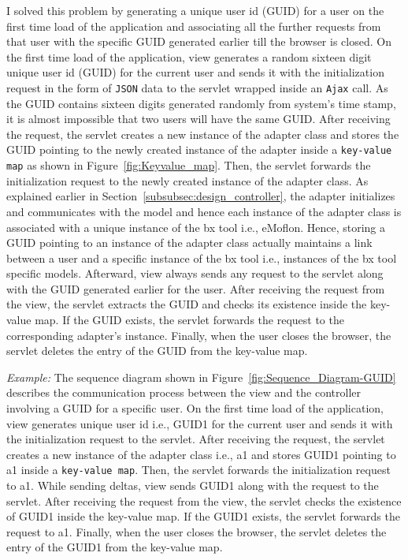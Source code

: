 I solved this problem by generating a unique user id (GUID) for a user on the first time load of the application and associating all the further requests from that user with the specific GUID generated earlier till the browser is closed. On the first time load of the application, view generates a random sixteen digit unique user id (GUID) for the current user and sends it with the initialization request in the form of \texttt{JSON} data to the servlet wrapped inside an \texttt{Ajax} call. As the GUID contains sixteen digits generated randomly from system's time stamp, it is almost impossible that two users will have the same GUID. After receiving the request, the servlet creates a new instance of the adapter class and stores the GUID pointing to the newly created instance of the adapter inside a \texttt{key-value map} as shown in Figure~\ref{fig:Keyvalue_map}. Then, the servlet forwards the initialization request to the newly created instance of the adapter class. As explained earlier in Section~\ref{subsubsec:design_controller}, the adapter initializes and communicates with the model and hence each instance of the adapter class is associated with a unique instance of the bx tool i.e., eMoflon. Hence, storing a GUID pointing to an instance of the adapter class actually maintains a link between a user and a specific instance of the bx tool i.e., instances of the bx tool specific models. Afterward, view always sends any request to the servlet along with the GUID generated earlier for the user. After receiving the request from the view, the servlet extracts the GUID and checks its existence inside the  key-value map. If the GUID exists, the servlet forwards the request to the corresponding adapter's instance. Finally, when the user closes the browser, the servlet deletes the entry of the GUID from the key-value map.

\textit{Example:} The sequence diagram shown in Figure~\ref{fig:Sequence_Diagram-GUID} describes the communication process between the view and the controller involving a GUID for a specific user. On the first time load of the application, view generates unique user id i.e., GUID1 for the current user and sends it with the initialization request to the servlet. After receiving the request, the servlet creates a new instance of the adapter class i.e., a1 and stores GUID1 pointing to a1 inside a \texttt{key-value map}. Then, the servlet forwards the initialization request to a1. While sending deltas, view sends GUID1 along with the request to the servlet. After receiving the request from the view, the servlet checks the existence of GUID1 inside the key-value map. If the GUID1 exists, the servlet forwards the request to a1. Finally, when the user closes the browser, the servlet deletes the entry of the GUID1 from the key-value map.

